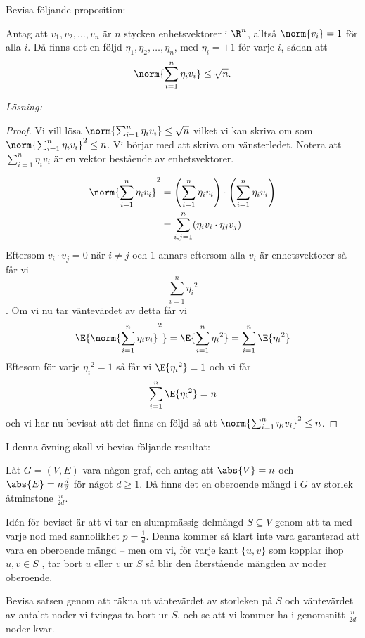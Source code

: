 \documentclass[nobib]{tufte-handout}
\begin{document}
\begin{xca}
    Bevisa följande proposition:

    \begin{proposition}
        Antag att $v_1, v_2, \ldots, v_n$ är $n$ stycken enhetsvektorer i $\R^n$, alltså $\norm{v_i} = 1$ för alla $i$. Då finns det en följd $\eta_1, \eta_2, \ldots, \eta_n$, med $\eta_i = \pm 1$ för varje $i$, sådan att
        $$\norm{\sum_{i=1}^{n} \eta_i v_i} \leq \sqrt{n}.$$ 
    \end{proposition}
\end{xca}
\textit{Lösning:} \begin{proof} Vi vill lösa $\norm{\sum_{i=1}^{n} \eta_i v_i} \leq \sqrt{n}$ vilket vi kan skriva om som $\norm{\sum_{i=1}^{n} \eta_i v_i}^2 \leq n$. Vi börjar med att skriva om vänsterledet. Notera att $\sum_{i=1}^{n} \eta_i v_i$ är en vektor bestående av enhetsvektorer. 

\begin{align*}
    \norm{\sum_{i=1}^{n} \eta_i v_i}^2 &= \left(\sum_{i=1}^{n} \eta_i v_i\right) \cdot \left(\sum_{i=1}^{n} \eta_i v_i\right) \\
    &= \sum_{i,j = 1}^{n} (\eta_i v_i \cdot \eta_j v_j) \\  
\end{align*}
Eftersom $v_i \cdot v_j = 0$ när $i \neq j$ och $1$ annars eftersom alla $v_i$ är enhetsvektorer så får vi 
$$\sum_{i=1}^{n}{\eta_i}^2$$. Om vi nu tar väntevärdet av detta får vi $$\E{\norm{\sum_{i=1}^{n} \eta_i v_i}^2} = \E{\sum_{i=1}^{n}{\eta_i}^2} = \sum_{i=1}^{n}\E{{\eta_i}^2}$$
Eftesom för varje ${\eta_i}^2 = 1$ så får vi $\E{{\eta_i}^2}=1$ och vi får $$\sum_{i=1}^{n}\E{{\eta_i}^2} = n$$ och vi har nu bevisat att det finns en följd så att $\norm{\sum_{i=1}^{n} \eta_i v_i}^2 \leq n$. 
\end{proof}
\begin{xca}
    I denna övning skall vi bevisa följande resultat:

    \begin{theorem}
        Låt $G = (V, E)$ vara någon graf, och antag att $\abs{V} = n$ och $\abs{E} = n\frac{d}{2}$ för något $d \geq 1$. Då finns det en oberoende mängd i $G$ av storlek åtminstone $\frac{n}{2d}$.
    \end{theorem}

    Idén för beviset är att vi tar en slumpmässig delmängd $S \subseteq V$ genom att ta med varje nod med sannolikhet $p = \frac{1}{d}$. Denna kommer så klart inte vara garanterad att vara en oberoende mängd -- men om vi, för varje kant $\{u, v\}$ som kopplar ihop $u, v \in S$ , tar bort $u$ eller $v$ ur $S$ så blir den återstående mängden av noder oberoende.

    Bevisa satsen genom att räkna ut väntevärdet av storleken på $S$ och väntevärdet av antalet noder vi tvingas ta bort ur $S$, och se att vi kommer ha i genomsnitt $\frac{n}{2d}$ noder kvar.
\end{xca}
\end{document}
